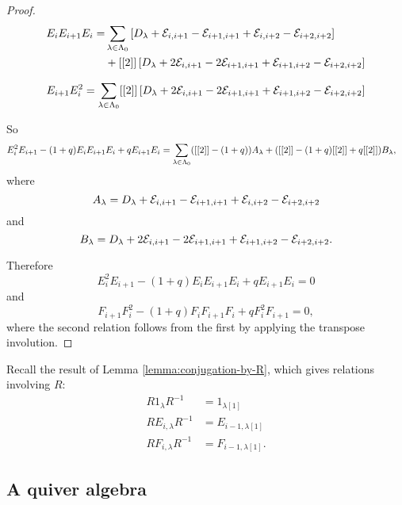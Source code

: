 \documentclass[a4paper, 11pt]{report}
\begin{document}
\begin{proof}
\begin{align*}
E_i E_{i+1} E_i = &\sum_{\lambda\in\Lambda_0{}} \left[D_{\lambda} +\mathcal{E}_{i,i+1} -\mathcal{E}_{i+1,i+1} +\mathcal{E}_{i,i+2} -\mathcal{E}_{i+2,i+2}\right]\\
&+[[2]]\left[D_{\lambda} +2\mathcal{E}_{i,i+1} -2\mathcal{E}_{i+1,i+1} +\mathcal{E}_{i+1,i+2} -\mathcal{E}_{i+2,i+2}\right]
\end{align*}

\begin{equation*}
E_{i+1}E_i^2 = \sum_{\lambda\in\Lambda_0{}} [[2]]\left[D_{\lambda} +2\mathcal{E}_{i,i+1} -2\mathcal{E}_{i+1,i+1} +\mathcal{E}_{i+1,i+2} -\mathcal{E}_{i+2,i+2}\right]
\end{equation*}

So
\begin{align*}
E_i^2E_{i+1} -(1+q)E_iE_{i+1}E_i +qE_{i+1}E_i &= \sum_{\lambda\in\Lambda_0{}} ([[2]] -(1+q))A_\lambda + ([[2]] -(1+q)[[2]] +q[[2]])B_\lambda,
\end{align*}
where
\begin{equation*}
A_\lambda = D_{\lambda} +\mathcal{E}_{i,i+1} -\mathcal{E}_{i+1,i+1} +\mathcal{E}_{i,i+2} -\mathcal{E}_{i+2,i+2}
\end{equation*}
and
\begin{equation*}
B_\lambda = D_{\lambda} +2\mathcal{E}_{i,i+1} -2\mathcal{E}_{i+1,i+1} +\mathcal{E}_{i+1,i+2} -\mathcal{E}_{i+2,i+2}.
\end{equation*}

Therefore
\begin{equation*}
E_i^2E_{i+1} -(1+q)E_iE_{i+1}E_i +qE_{i+1}E_i = 0
\end{equation*}
and
\begin{equation*}
F_{i+1}F_i^2 -(1+q)F_iF_{i+1}F_i +qF_i^2F_{i+1} = 0,
\end{equation*}
where the second relation follows from the first by applying the transpose involution.
\end{proof}

Recall the result of Lemma \ref{lemma:conjugation-by-R}, which gives relations involving $R$:
\begin{align*}
R1_\lambda R^{-1} &= 1_{\lambda[1]}\\
RE_{i,\lambda}R^{-1} &= E_{i-1,\lambda[1]}\\
RF_{i,\lambda}R^{-1} &= F_{i-1,\lambda[1]}.
\end{align*}


\subsection{A quiver algebra}\label{section:q-quiver}
\end{document}
